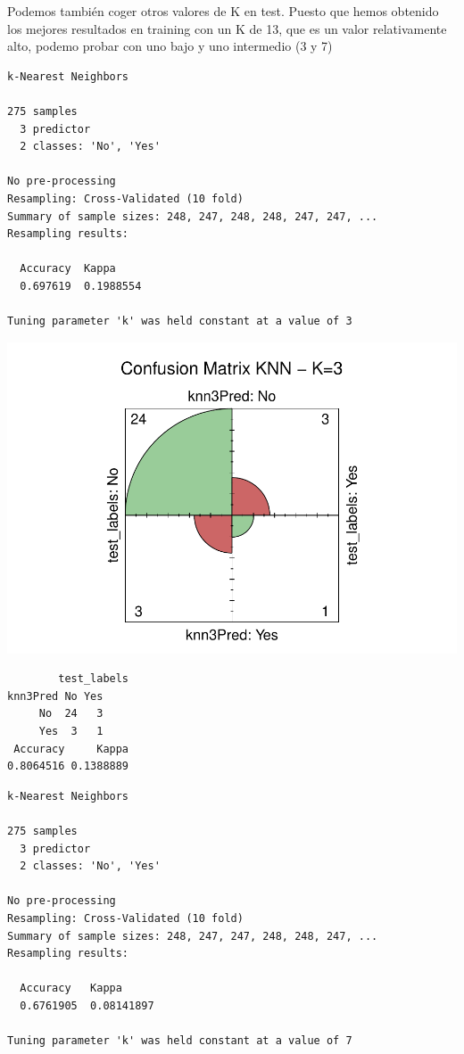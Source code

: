 \documentclass[
]{article}
\begin{document}
Podemos también coger otros valores de K en test. Puesto que hemos
obtenido los mejores resultados en training con un K de 13, que es un
valor relativamente alto, podemo probar con uno bajo y uno intermedio (3
y 7)

\begin{verbatim}
k-Nearest Neighbors 

275 samples
  3 predictor
  2 classes: 'No', 'Yes' 

No pre-processing
Resampling: Cross-Validated (10 fold) 
Summary of sample sizes: 248, 247, 248, 248, 247, 247, ... 
Resampling results:

  Accuracy  Kappa    
  0.697619  0.1988554

Tuning parameter 'k' was held constant at a value of 3
\end{verbatim}

\begin{center}\includegraphics{Clasificacion_files/figure-latex/unnamed-chunk-14-1} \end{center}

\begin{verbatim}
        test_labels
knn3Pred No Yes
     No  24   3
     Yes  3   1
 Accuracy     Kappa 
0.8064516 0.1388889 
\end{verbatim}

\begin{verbatim}
k-Nearest Neighbors 

275 samples
  3 predictor
  2 classes: 'No', 'Yes' 

No pre-processing
Resampling: Cross-Validated (10 fold) 
Summary of sample sizes: 248, 247, 247, 248, 248, 247, ... 
Resampling results:

  Accuracy   Kappa     
  0.6761905  0.08141897

Tuning parameter 'k' was held constant at a value of 7
\end{verbatim}
\end{document}
